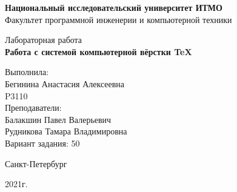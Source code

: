 \thispagestyle{empty}
\begin{center}
    {\bfseries Национальный исследовательский университет ИТМО}\\
    Факультет программной инженерии и компьютерной техники

    \vspace{20em}

    {\large Лабораторная работа }\\
    {\Large \textbf{Работа с системой компьютерной вёрстки \TeX}}
\end{center}

\vspace{15em}

\begin{flushright}
    Выполнила:\\
    Бегинина Анастасия Алексеевна\\
    P3110\\
    Преподаватели:\\
    Балакшин Павел Валерьевич\\
    Рудникова Тамара Владимировна\\
    Вариант задания: 50\\

\end{flushright}

\vspace{\fill}

\begin{center}
Санкт-Петербург

2021г.
\end{center}